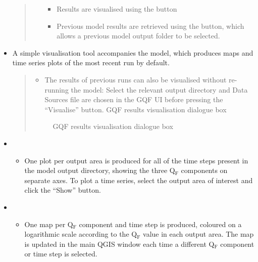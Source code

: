\documentclass[letterpaper,10pt,english]{sphinxmanual}
\begin{document}
\begin{itemize}
\begin{quote}
\begin{enumerate}
\begin{itemize}
\item {} 
Results are visualised using the  button

\item {} 
Previous model results are retrieved using the  button, which allows a previous model output folder to be selected.

\end{itemize}

\end{enumerate}
\end{quote}

\item {} 
 A simple visualisation tool accompanies the model, which produces maps and time series plots of the most recent run by default.
\begin{quote}
\begin{itemize}
\item {} 
The results of previous runs can also be visualised without re-running the model: Select the relevant output directory and Data Sources file are chosen in the GQF UI before pressing the “Visualise” button.    GQF results visualisation dialogue box

\end{itemize}

\begin{figure}[htbp]
\centering
\capstart

\noindent{}
\caption{GQF results visualisation dialogue box}\label{\detokenize{OtherManuals/GQF_Manual:id5}}\end{figure}
\end{quote}

\item {} 
\begin{itemize}
\item {} 
One plot per output area is produced for all of the time steps present in the model output directory, showing the three Q$_{\text{F}}$ components on separate axes. To plot a time series, select the output area of interest and click the “Show” button.

\end{itemize}

\item {} 
\begin{itemize}
\item {} 
One map per Q$_{\text{F}}$ component and time step is produced, coloured on a logarithmic scale according to the Q$_{\text{F}}$ value in each output area. The map is updated in the main QGIS window each time a different Q$_{\text{F}}$ component or time step is selected.

\end{itemize}

\end{itemize}
\end{document}
